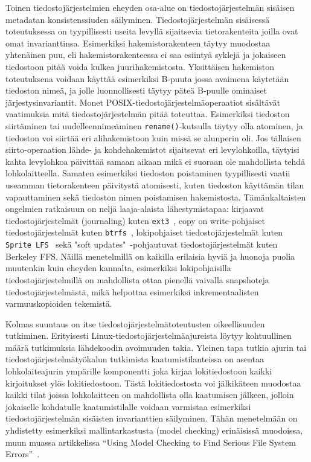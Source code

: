 \documentclass[a4paper]{article}
\begin{document}
Toinen tiedostojärjestelmien eheyden osa-alue on tiedostojärjestelmän sisäisen metadatan konsistenssiuden säilyminen.
Tiedostojärjestelmän sisäisessä toteutuksessa on tyypillisesti useita levyllä sijaitsevia tietorakenteita joilla ovat omat invarianttinsa.
Esimerkiksi hakemistorakenteen täytyy muodostaa yhtenäinen puu,
eli hakemistorakenteessa ei saa esiintyä syklejä ja jokaiseen tiedostoon pitää voida kulkea juurihakemistosta.
Yksittäisen hakemiston toteutuksena voidaan käyttää esimerkiksi B-puuta jossa avaimena käytetään tiedoston nimeä,
ja jolle luonnollisesti täytyy päteä B-puulle ominaiset järjestysinvariantit.
Monet POSIX-tiedostojärjestelmäoperaatiot sisältävät vaatimuksia mitä tiedostojärjestelmän pitää toteuttaa.
Esimerkiksi tiedoston siirtäminen tai uudelleennimeäminen \texttt{rename()}-kutsulla täytyy olla atominen,
ja tiedoston voi siirtää eri alihakemistoon kuin missä se alunperin oli.
Jos tällaisen siirto-operaation lähde- ja kohdehakemistot sijaitsevat eri levylohkoilla,
täytyisi kahta levylohkoa päivittää samaan aikaan mikä ei suoraan ole mahdollista tehdä lohkolaitteella.
Samaten esimerkiksi tiedoston poistaminen tyypillisesti vaatii useamman tietorakenteen päivitystä atomisesti,
kuten tiedoston käyttämän tilan vapauttaminen sekä tiedoston nimen poistamisen hakemistosta.
Tämänkaltaisten ongelmien ratkaisuun on neljä laaja-alaista lähestymistapaa:
kirjaavat tiedostojärjestelmät (journaling) kuten \texttt{ext3}~\cite{Ext2Journal},
copy on write-pohjaiset tiedostojärjestelmät kuten \texttt{btrfs}~\cite{Btrfs},
lokipohjaiset tiedostojärjestelmät kuten \texttt{Sprite LFS}~\cite{SpriteLfs} sekä "soft updates"~\cite{SoftUpdates}-pohjautuvat tiedostojärjestelmät kuten Berkeley FFS.
Näillä menetelmillä on kaikilla erilaisia hyviä ja huonoja puolia muutenkin kuin eheyden kannalta,
esimerkiksi lokipohjaisilla tiedostojärjestelmillä on mahdollista ottaa
pienellä vaivalla snapshoteja tiedostojärjestelmästä,
mikä helpottaa esimerkiksi inkrementaalisten varmuuskopioiden tekemistä.

Kolmas suuntaus on itse tiedostojärjestelmätoteutusten oikeellisuuden tutkiminen.
Erityisesti Linux-tiedostojärjestelmäajureista löytyy kohtuullinen määrä tutkimuksia lähdekoodin avoimuuden takia.
Yleinen tapa tutkia ajurin tai tiedostojärjestelmätyökalun tutkimista kaatumistilanteissa on asentaa lohkolaiteajurin ympärille komponentti
joka kirjaa lokitiedostoon kaikki kirjoitukset ylös lokitiedostoon.
Tästä lokitiedostosta voi jälkikäteen muodostaa kaikki tilat joissa lohkolaitteen on mahdollista olla kaatumisen jälkeen,
jolloin jokaiselle kohdatulle kaatumistilalle voidaan varmistaa esimerkiksi tiedostojärjestelmän sisäisten invarianttien säilyminen.
Tähän menetelmään on yhdistetty esimerkiksi mallintarkastusta (model checking) erinäisissä muodoissa,
muun muassa artikkelissa ``Using Model Checking to Find Serious File System Errors''~\cite{ModelChecking}.



\end{document}
